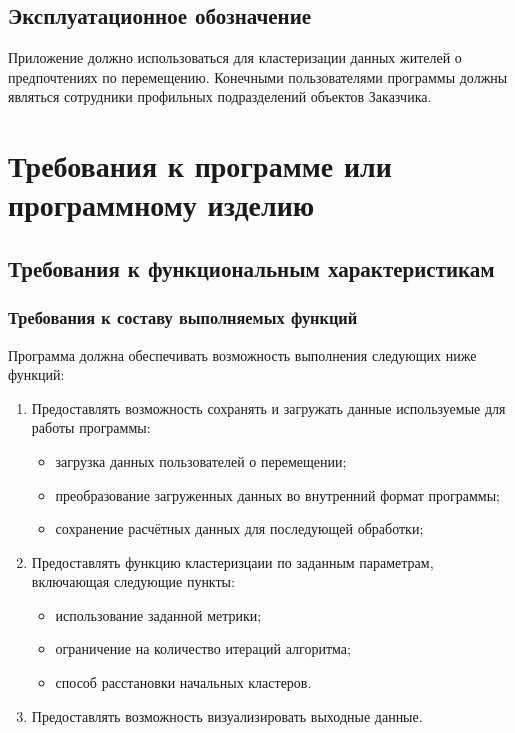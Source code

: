 \section{Эксплуатационное обозначение}
Приложение должно использоваться для кластеризации данных жителей о предпочтениях по перемещению. Конечными пользователями программы должны являться сотрудники профильных подразделений объектов Заказчика.

\chapter{Требования к программе или программному изделию}
\section{Требования к функциональным характеристикам}
\subsection{Требования к составу выполняемых функций}
Программа должна обеспечивать возможность выполнения следующих ниже функций:
\begin{enumerate}
    \item Предоставлять возможность сохранять и загружать данные используемые для работы программы:
    \begin{itemize}
        \item загрузка данных пользователей о перемещении;
        \item преобразование загруженных данных во внутренний формат программы;
        \item сохранение расчётных данных для последующей обработки;
    \end{itemize}
    \item Предоставлять функцию кластеризцаии по заданным параметрам, включающая следующие пункты:
    \begin{itemize}
        \item использование заданной метрики;
        \item ограничение на количество итераций алгоритма;
        \item способ расстановки начальных кластеров.
    \end{itemize}
    \item Предоставлять возможность визуализировать выходные данные.
\end{enumerate}

